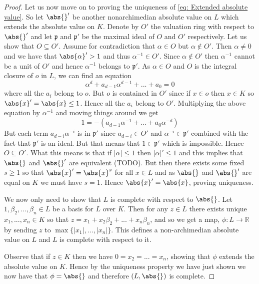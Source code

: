 \documentclass{article}
\newcommand{\mfrak}[1]{\mathfrak{#1}}
\newcommand{\mbb}[1]{\mathbb{#1}}
\numberwithin{equation}{section}
\begin{document}
\begin{proof}
    Let us now move on to proving the uniqueness of \cref{eq: Extended absolute value}. So let $\abs{}'$ be another nonarchimedian absolute value on $L$ which extends the absolute value on $K$. Denote by $O'$ the valuation ring with respect to $\abs{}'$ and let $\mfrak p$ and $\mfrak p'$ be the maximal ideal of $O$ and $O'$ respectively. Let us show that $O \subseteq O'$. Assume for contradiction that $\alpha \in O$ but $\alpha \notin O'$. Then $\alpha \neq 0$ and we have that $\abs{\alpha}' > 1$ and thus $\alpha^{-1} \in O'$. Since $\alpha \notin O'$ then $\alpha^{-1}$ cannot be a unit of $O'$ and hence $\alpha^{-1}$ belongs to $\mfrak p'$. As $\alpha \in O$ and $O$ is the integral closure of $o$ in $L$, we can find an equation
    $$\alpha^d + a_{d-1}\alpha^{d-1} + ... + a_0 = 0$$
    where all the $a_i$ belong to $o$. But $o$ is contained in $O'$ since if $x \in o$ then $x \in K$ so $\abs{x}' = \abs{x} \leq 1$. Hence all the $a_i$ belong to $O'$. Multiplying the above equation by $\alpha^{-1}$ and moving things around we get $$1 = -(a_{d-1}\alpha^{-1} + ... + a_0\alpha^{-d})$$
    But each term $a_{d-i} \alpha^{-i}$ is in $\mfrak p'$ since $a_{d-i} \in O'$ and $\alpha^{-i} \in \mfrak p'$ combined with the fact that $\mfrak p'$ is an ideal. But that means that $1 \in \mfrak p'$ which is impossible. Hence $O \subseteq O'$. What this means is that if $|\alpha| \leq 1$ then $|\alpha|' \leq 1$ and this implies that $\abs{}$ and $\abs{}'$ are equivalent (TODO). But then there exists some fixed $s \geq 1$ so that $\abs{x}' = \abs{x}^s$ for all $x \in L$ and as $\abs{}$ and $\abs{}'$ are equal on $K$ we must have $s = 1$. Hence $\abs{x}' = \abs{x}$, proving uniqueness.

    We now only need to show that $L$ is complete with respect to $\abs{}$. Let $1, \beta_2, ..., \beta_{n} \in L$ be a basis for $L$ over $K$. Then for any $z \in L$ there exists unique $x_1, ..., x_n \in K$ so that $z = x_1 + x_2 \beta_2 + ... + x_{n}\beta_{n}$, and so we get a map, $\phi : L \to \mbb R$ by sending $z$ to $\max \{|x_1|, ...,|x_n|\}$. This defines a non-archimedian absolute value on $L$ and $L$ is complete with respect to it.



    Observe that if $z \in K$ then we have $0 = x_2 = ... = x_n$, showing that $\phi$ extends the absolute value on $K$. Hence by the uniqueness property we have just shown we now have that $\phi = \abs{}$ and therefore $(L, \abs{})$ is complete.
\end{proof}
\end{document}
